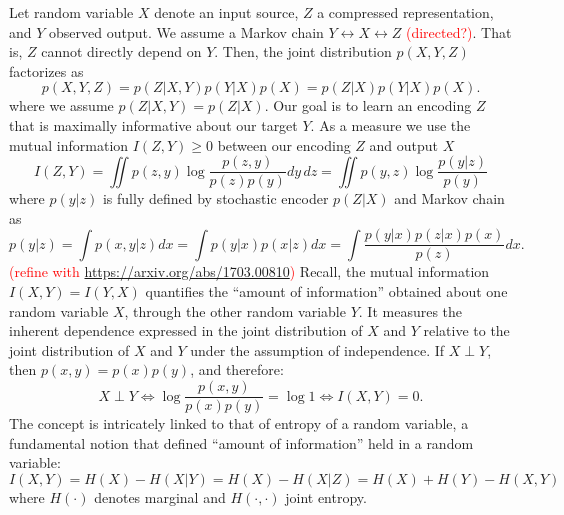 \documentclass[11pt]{article}
\newcommand\myworries[1]{\textcolor{red}{(#1)}}
\begin{document}
Let random variable $X$ denote an input source, $Z$ a compressed representation, and $Y$ observed output. We assume a Markov chain $Y \leftrightarrow X \leftrightarrow Z$ \myworries{directed?}. That is, $Z$ cannot directly depend on $Y$. Then, the joint distribution $p(X,Y,Z)$ factorizes as
\begin{equation}
p(X, Y, Z) = p(Z\vert X,Y)p(Y\vert X)p(X) = p(Z\vert X)p(Y\vert X)p(X).
\end{equation}
where we assume $p(Z\vert X,Y) = p(Z\vert X)$.
Our goal is to learn an encoding $Z$ that is maximally informative about our target $Y$. As a measure we use the mutual information $I(Z,Y) \geq 0$ between our encoding $Z$ and output $X$
\begin{equation}
I(Z,Y) = \iint p(z,y) \log \frac{p(z,y)}{p(z)p(y)} dy\, dz = \iint p(y,z) \log \frac{p(y\vert z)}{p(y)}
\label{eq:I_Z_Y}
\end{equation}
where  $p(y\vert z)$ is fully defined by stochastic encoder $p(Z\vert X)$ and Markov chain as
\begin{equation}
p(y\vert z) = \int p(x,y\vert z) dx = \int p(y \vert x) p(x \vert z) dx = \int \frac{p(y \vert x)p(z \vert x) p(x)}{p(z)}dx.
\label{eq:p_y_z}
\end{equation}
\myworries{refine with \url{https://arxiv.org/abs/1703.00810}}
Recall, the mutual information $I(X,Y) = I(Y,X)$ quantifies the ``amount of information'' obtained about one random variable $X$, through the other random variable $Y$. It measures the inherent dependence expressed in the joint distribution of $X$ and $Y$ relative to the joint distribution of $X$ and $Y$ under the assumption of independence. If $X \perp Y$, then $p(x,y) = p(x)p(y)$, and therefore:
\begin{equation}
X \perp Y \Leftrightarrow \log\frac{p(x,y)}{p(x)p(y)} = \log 1 \Leftrightarrow I(X,Y) = 0.
\end{equation}
The concept is intricately linked to that of entropy of a random variable, a fundamental notion that defined ``amount of information'' held in a random variable:
\begin{equation}
I(X,Y) = H(X) - H(X \vert Y) = H(X) - H(X \vert Z) = H(X) + H(Y) - H(X,Y)
\end{equation}
where $H(\cdot)$ denotes marginal and $H(\cdot,\cdot)$ joint entropy.
\end{document}
